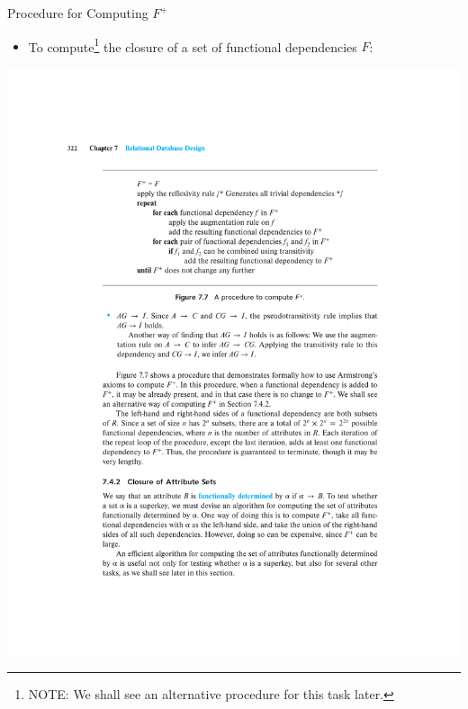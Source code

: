 \documentclass{beamer}
\begin{document}
\begin{frame}{Procedure for Computing $F^+$}
    \begin{itemize}
        \item To compute\footnote{NOTE: We shall see an alternative procedure for this task later.} the closure of a set of functional dependencies $F$:
    \end{itemize}
    \centering
    \includegraphics[width=\textwidth, trim={4cm 16.5cm 4cm 4.5cm}, clip]{figures/p322_Fplus_procedure}
\end{frame}
\end{document}

